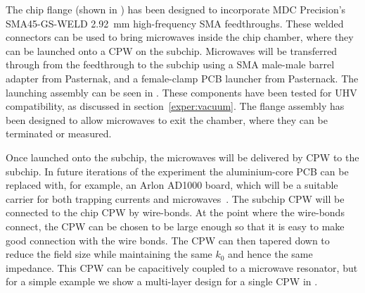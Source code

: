 
The chip flange (shown in ) has been
designed to incorporate MDC Precision's SMA45-GS-WELD \SI{2.92}{\milli\meter}
high-frequency SMA feedthroughs. These welded connectors can be used to bring
microwaves inside the chip chamber, where they can be launched onto a CPW on
the subchip. Microwaves will be transferred through from the feedthrough to the
subchip using a SMA male-male barrel adapter from Pasternak, and a female-clamp
PCB launcher from Pasternack. The launching assembly can be seen in
. These components have been tested for UHV
compatibility, as discussed in section~\ref{exper:vacuum}.  The flange
assembly has been designed to allow microwaves to exit the chamber, where they
can be terminated or measured.

Once launched onto the subchip, the microwaves will be delivered by CPW to the
subchip. 
%
In future iterations of the experiment the aluminium-core PCB can be replaced
with, for example, an Arlon AD1000 board, which will be a suitable carrier for
both trapping currents and microwaves~\cite{Morgan2020}. 
%
The subchip CPW will be connected to the chip CPW by wire-bonds.  At
the point where the wire-bonds connect, the CPW can be chosen to be 
large enough so that it is easy to make good connection with the wire bonds. The CPW
can then tapered down to reduce the field size while maintaining the same $k_0$
and hence the same impedance. This CPW can be capacitively coupled to a
microwave resonator, but for a simple example we show a multi-layer design for
a single CPW in .

